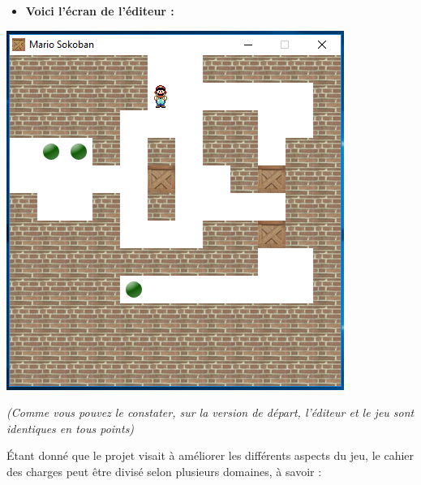 \documentclass[english,11pt]{report}
\begin{document}
%
\vspace{0.2cm}
\begin{itemize}[label=]
    \item{\textbf{Voici l'écran de l'éditeur :}}
\end{itemize}
\vspace{0.2cm}
%
\begin{center} 
\includegraphics[scale=0.75]{editeurO}
\end{center}
\vspace{0.5cm}
\textit{(Comme vous pouvez le constater, sur la version de départ, l'éditeur et le jeu sont identiques en tous points)}\par
\vspace{0.2cm}
Étant donné que le projet visait à améliorer les différents aspects du jeu, le cahier des charges peut être divisé selon plusieurs domaines, à savoir :\par
\vspace{0,1cm}
\end{document}
